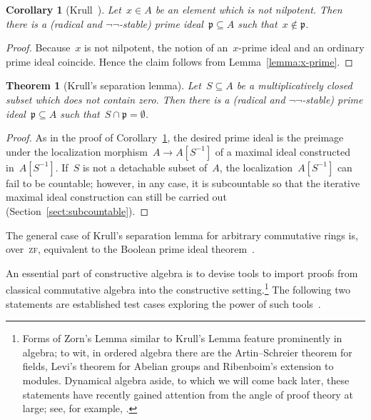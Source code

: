 \documentclass[com,11pt,crcready]{iosart2x}
\theoremstyle{definition}
\theoremstyle{plain}
\newtheorem{corollary}[definition]{Corollary}
\newtheorem{theorem}[definition]{Theorem}
\theoremstyle{remark}
\newcommand{\?}{\,{:}\,}
\newcommand{\ppp}{\mathfrak{p}}
\renewcommand{\_}{\mathpunct{.}\,}
\begin{document}
\begin{corollary}[Krull~\cite{krull:ohne}]\label{cor:nilp-prime}Let~$x \in A$ be an element which is not nilpotent. Then there is a
(radical and $\neg\neg$-stable) prime ideal~$\ppp \subseteq A$ such that~$x \not\in \ppp$.
\end{corollary}

\begin{proof}Because~$x$ is not nilpotent, the notion of an~$x$-prime ideal and
an ordinary prime ideal coincide. Hence the claim follows from
Lemma~\ref{lemma:x-prime}.\end{proof}

\begin{theorem}[Krull's separation lemma]Let~$S \subseteq A$ be a multiplicatively closed subset which
does not contain zero. Then there is a
(radical and $\neg\neg$-stable) prime ideal~$\ppp \subseteq A$ such that~$S
\cap \ppp = \emptyset$.
\end{theorem}

\begin{proof}As in the proof of Corollary~\ref{cor:nilp-prime}, the desired
prime ideal is the preimage under the localization morphism~$A \to A[S^{-1}]$
of a maximal ideal constructed in~$A[S^{-1}]$. If~$S$ is not a detachable
subset of~$A$, the localization~$A[S^{-1}]$ can fail to be countable; however,
in any case, it is subcountable so that the iterative maximal ideal
construction can still be carried out (Section~\ref{sect:subcountable}).
\end{proof}

The general case of Krull's separation lemma for arbitrary commutative rings
is, over~\textsc{zf}, equivalent to the Boolean prime ideal
theorem~\cite{banaschweski-erne:krull}.

An essential part of constructive algebra is to devise tools to import
proofs from classical commutative algebra into the constructive
setting.\footnote{Forms of Zorn's Lemma similar to Krull's Lemma
feature prominently in algebra; to wit, in ordered algebra there are the
Artin--Schreier theorem for fields, Levi's theorem for Abelian groups and
Ribenboim's extension to modules. Dynamical algebra aside, to which we will
come back later, these statements have recently gained attention from the angle
of proof theory at large; see, for example,
\cite{rin:ukl,rin:edde,rin:edde:full,wessel:ordering,schuster-wessel:ext,wessel:conred,bon:rib,pow:occ}.}
The following two statements are established test cases exploring the power of
such tools~\cite{schuster:induction,schuster:inductionjournal,persson:constructive-spectrum,powell-schuster-wiesnet:krull,swy:dynprime,schuster-wessel:indeterminacy,banaschweski-vermeulen:radical,richman:trivial-rings,coquand-lombardi:logical,coquand-lombardi-roy:dynamicalmethod}.
\end{document}
